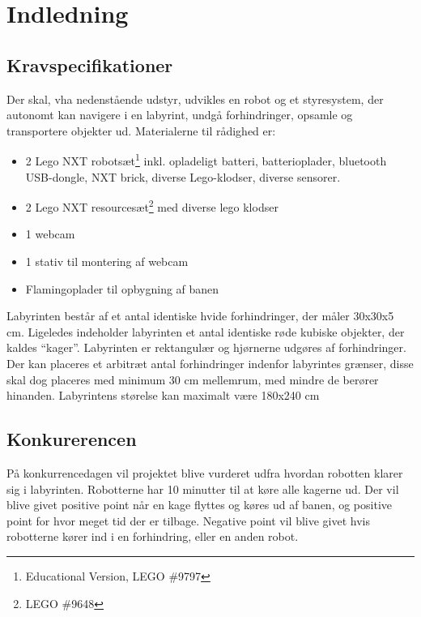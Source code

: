 \chapter{Indledning}

\section{Kravspecifikationer}
Der skal, vha nedenstående udstyr, udvikles en robot og et styresystem, der autonomt kan navigere i en labyrint, undgå forhindringer, opsamle og transportere objekter ud.
Materialerne til rådighed er:
\begin{itemize}
\item 2 Lego NXT robotsæt\footnote{Educational Version, LEGO \#9797} inkl. opladeligt batteri, batterioplader, bluetooth USB-dongle, NXT brick, diverse Lego-klodser, diverse sensorer.
\item 2 Lego NXT resourcesæt\footnote{LEGO \#9648} med diverse lego klodser
\item 1 webcam
\item 1 stativ til montering af webcam
\item Flamingoplader til opbygning af banen
\end{itemize}

Labyrinten består af et antal identiske hvide forhindringer, der måler 30x30x5 cm. Ligeledes indeholder labyrinten et antal identiske røde kubiske objekter, der kaldes "`kager"'. Labyrinten er rektangulær og hjørnerne udgøres af forhindringer. Der kan placeres et arbitræt antal forhindringer indenfor labyrintes grænser, disse skal dog placeres med minimum 30 cm mellemrum, med mindre de berører hinanden. Labyrintens størelse kan maximalt være 180x240 cm

\section{Konkurerencen}
På konkurrencedagen vil projektet blive vurderet udfra hvordan robotten klarer sig i labyrinten. Robotterne har 10 minutter til at køre alle kagerne ud. Der vil blive givet positive point når en kage flyttes og køres ud af banen, og positive point for hvor meget tid der er tilbage. Negative point vil blive givet hvis robotterne kører ind i en forhindring, eller en anden robot.